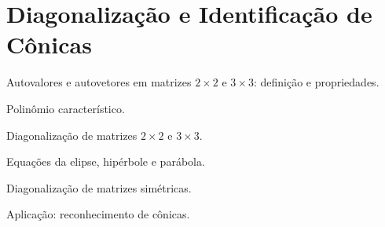 \chapter{Diagonalização e Identificação de Cônicas}

Autovalores e autovetores em matrizes $2\times 2$ e $3\times 3$:
definição e propriedades.

Polinômio característico.

Diagonalização de matrizes $2\times 2$ e $3\times 3$.

Equações da elipse, hipérbole e parábola.

Diagonalização de matrizes simétricas.

Aplicação: reconhecimento de cônicas.

